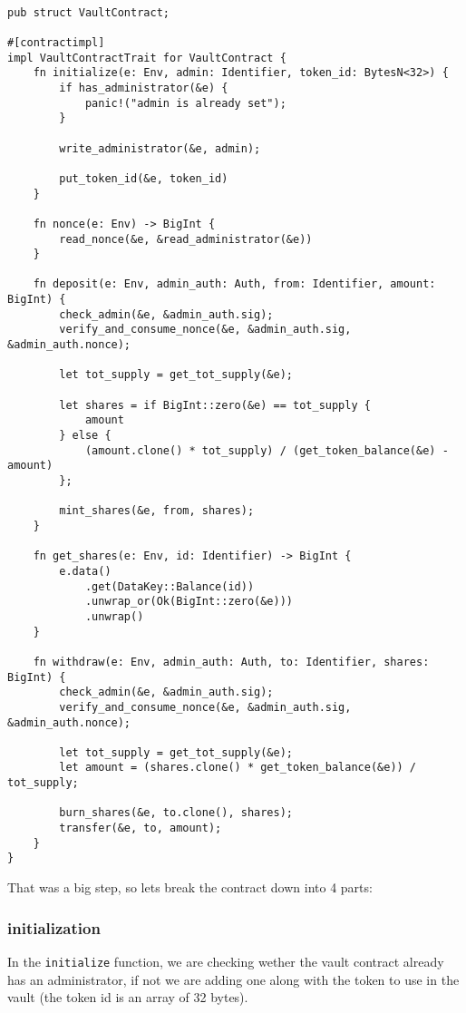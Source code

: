 \documentclass{article}
\newcommand{\inl}[1]{\lstinline{#1}}
\begin{document}
\begin{lstlisting}

pub struct VaultContract;

#[contractimpl]
impl VaultContractTrait for VaultContract {
    fn initialize(e: Env, admin: Identifier, token_id: BytesN<32>) {
        if has_administrator(&e) {
            panic!("admin is already set");
        }

        write_administrator(&e, admin);

        put_token_id(&e, token_id)
    }

    fn nonce(e: Env) -> BigInt {
        read_nonce(&e, &read_administrator(&e))
    }

    fn deposit(e: Env, admin_auth: Auth, from: Identifier, amount: BigInt) {
        check_admin(&e, &admin_auth.sig);
        verify_and_consume_nonce(&e, &admin_auth.sig, &admin_auth.nonce);

        let tot_supply = get_tot_supply(&e);

        let shares = if BigInt::zero(&e) == tot_supply {
            amount
        } else {
            (amount.clone() * tot_supply) / (get_token_balance(&e) - amount)
        };

        mint_shares(&e, from, shares);
    }

    fn get_shares(e: Env, id: Identifier) -> BigInt {
        e.data()
            .get(DataKey::Balance(id))
            .unwrap_or(Ok(BigInt::zero(&e)))
            .unwrap()
    }

    fn withdraw(e: Env, admin_auth: Auth, to: Identifier, shares: BigInt) {
        check_admin(&e, &admin_auth.sig);
        verify_and_consume_nonce(&e, &admin_auth.sig, &admin_auth.nonce);

        let tot_supply = get_tot_supply(&e);
        let amount = (shares.clone() * get_token_balance(&e)) / tot_supply;

        burn_shares(&e, to.clone(), shares);
        transfer(&e, to, amount);
    }
}

\end{lstlisting}

That was a big step, so lets break the contract down into 4 parts:

\subsubsection{initialization}
In the \inl{initialize} function, we are checking wether the vault contract already has an administrator, if not we are adding one along with the token to use in the vault (the token id is an array of 32 bytes).
\end{document}
